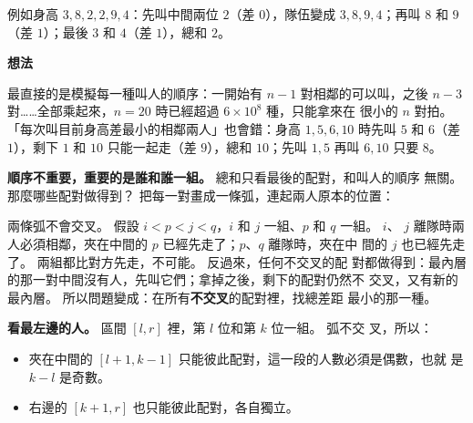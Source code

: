 例如身高 $3, 8, 2, 2, 9, 4$：先叫中間兩位 $2$（差 $0$），隊伍變成
$3, 8, 9, 4$；再叫 $8$ 和 $9$（差 $1$）；最後 $3$ 和 $4$（差 $1$），總和 $2$。

\textbf{想法}

最直接的是模擬每一種叫人的順序：一開始有 $n - 1$ 對相鄰的可以叫，之後
$n - 3$ 對……全部乘起來，$n = 20$ 時已經超過 $6 \times 10^8$ 種，只能拿來在
很小的 $n$ 對拍。 「每次叫目前身高差最小的相鄰兩人」也會錯：身高
$1, 5, 6, 10$ 時先叫 $5$ 和 $6$（差 $1$），剩下 $1$ 和 $10$ 只能一起走（差
$9$），總和 $10$；先叫 $1, 5$ 再叫 $6, 10$ 只要 $8$。

\textbf{順序不重要，重要的是誰和誰一組。} 總和只看最後的配對，和叫人的順序
無關。 那麼哪些配對做得到？ 把每一對畫成一條弧，連起兩人原本的位置：

\begin{center}
\label{fig:ivdp-arcs}
\end{center}

兩條弧不會交叉。 假設 $i < p < j < q$，$i$ 和 $j$ 一組、$p$ 和 $q$ 一組。 $i$、
$j$ 離隊時兩人必須相鄰，夾在中間的 $p$ 已經先走了；$p$、$q$ 離隊時，夾在中
間的 $j$ 也已經先走了。 兩組都比對方先走，不可能。 反過來，任何不交叉的配
對都做得到：最內層的那一對中間沒有人，先叫它們；拿掉之後，剩下的配對仍然不
交叉，又有新的最內層。 所以問題變成：在所有\textbf{不交叉}的配對裡，找總差距
最小的那一種。

\textbf{看最左邊的人。} 區間 $[l, r]$ 裡，第 $l$ 位和第 $k$ 位一組。 弧不交
叉，所以：

\begin{itemize}
\item 夾在中間的 $[l + 1, k - 1]$ 只能彼此配對，這一段的人數必須是偶數，也就
是 $k - l$ 是奇數。
\item 右邊的 $[k + 1, r]$ 也只能彼此配對，各自獨立。
\end{itemize}

\begin{center}
\end{center}

